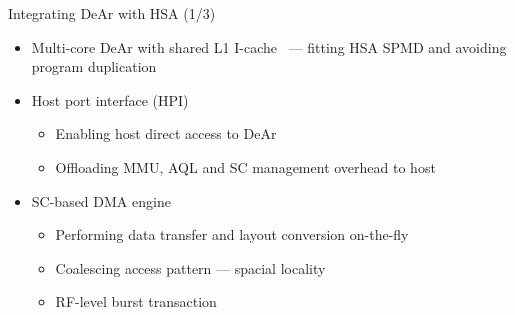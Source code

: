 \documentclass{beamer}
\begin{document}
\begin{CJK}{UTF8}{bkai}
            \begin{frame}{Integrating DeAr with HSA (1/3)}
                \begin{itemize}
                    \item <2-> {Multi-core DeAr with shared L1 I-cache~ --- fitting HSA SPMD and avoiding program duplication}
                    \item <3-> {Host port interface (HPI)~
                            \begin{itemize}
                                \item Enabling host direct access to DeAr
                                \item Offloading MMU, AQL and SC management overhead to host
                            \end{itemize}
                        }
                    \item <4-> {SC-based DMA engine~
                            \begin{itemize}
                                \item Performing data transfer and layout conversion on-the-fly
                                \item Coalescing access pattern --- spacial locality
                                \item RF-level burst transaction
                            \end{itemize}
                        }
                \end{itemize}
            \end{frame}


\end{CJK}
\end{document}
